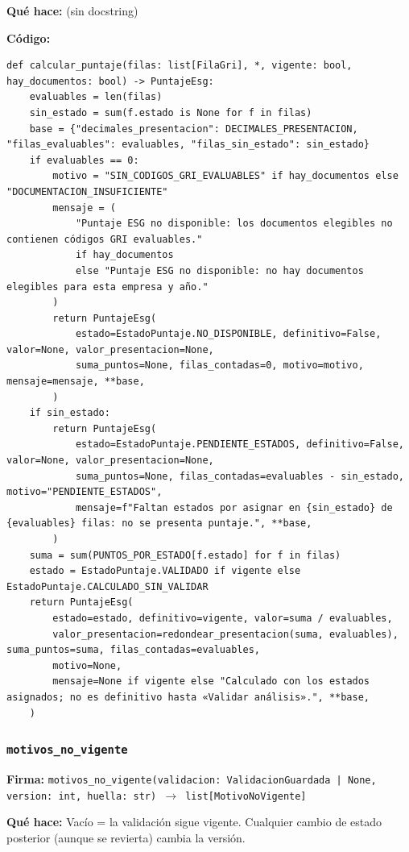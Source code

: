 \documentclass[11pt,a4paper]{article}
\begin{document}
\textbf{Qué hace:} (sin docstring)

\textbf{Código:}
\begin{lstlisting}
def calcular_puntaje(filas: list[FilaGri], *, vigente: bool, hay_documentos: bool) -> PuntajeEsg:
    evaluables = len(filas)
    sin_estado = sum(f.estado is None for f in filas)
    base = {"decimales_presentacion": DECIMALES_PRESENTACION, "filas_evaluables": evaluables, "filas_sin_estado": sin_estado}
    if evaluables == 0:
        motivo = "SIN_CODIGOS_GRI_EVALUABLES" if hay_documentos else "DOCUMENTACION_INSUFICIENTE"
        mensaje = (
            "Puntaje ESG no disponible: los documentos elegibles no contienen códigos GRI evaluables."
            if hay_documentos
            else "Puntaje ESG no disponible: no hay documentos elegibles para esta empresa y año."
        )
        return PuntajeEsg(
            estado=EstadoPuntaje.NO_DISPONIBLE, definitivo=False, valor=None, valor_presentacion=None,
            suma_puntos=None, filas_contadas=0, motivo=motivo, mensaje=mensaje, **base,
        )
    if sin_estado:
        return PuntajeEsg(
            estado=EstadoPuntaje.PENDIENTE_ESTADOS, definitivo=False, valor=None, valor_presentacion=None,
            suma_puntos=None, filas_contadas=evaluables - sin_estado, motivo="PENDIENTE_ESTADOS",
            mensaje=f"Faltan estados por asignar en {sin_estado} de {evaluables} filas: no se presenta puntaje.", **base,
        )
    suma = sum(PUNTOS_POR_ESTADO[f.estado] for f in filas)
    estado = EstadoPuntaje.VALIDADO if vigente else EstadoPuntaje.CALCULADO_SIN_VALIDAR
    return PuntajeEsg(
        estado=estado, definitivo=vigente, valor=suma / evaluables,
        valor_presentacion=redondear_presentacion(suma, evaluables), suma_puntos=suma, filas_contadas=evaluables,
        motivo=None,
        mensaje=None if vigente else "Calculado con los estados asignados; no es definitivo hasta «Validar análisis».", **base,
    )
\end{lstlisting}

\subsubsection*{\texttt{motivos\_no\_vigente}}
\textbf{Firma:} \texttt{motivos\_no\_vigente(validacion: ValidacionGuardada | None, version: int, huella: str) $\rightarrow$ list[MotivoNoVigente]}

\textbf{Qué hace:} Vacío = la validación sigue vigente. Cualquier cambio de estado posterior (aunque se revierta) cambia la versión.
\end{document}
